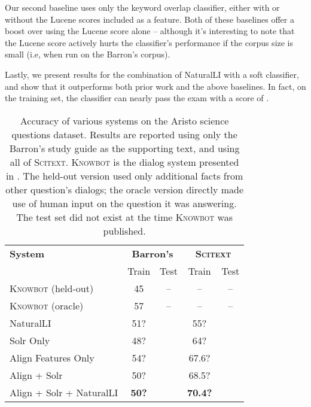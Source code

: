 Our second baseline uses only the keyword overlap classifier, either with or without
  the Lucene scores included as a feature.
Both of these baselines offer a boost over using the Lucene score alone -- although
  it's interesting to note that the Lucene score actively hurts the classifier's
  performance if the corpus size is small (i.e, when run on the Barron's corpus).

Lastly, we present results for the combination of NaturalLI with a soft classifier,
  and show that it outperforms both prior work and the above baselines.
In fact, on the training set, the classifier can nearly pass the exam with a score
  of .

%
%
\def\t#1{\small{#1}}
\def\b#1{\t{\textbf{#1}}}
\def\colspaceS{2.0mm}
\def\colspaceM{3.0mm}
\def\colspaceL{4.0mm}

\begin{table}
\begin{center}
\begin{tabular}{l@{\hskip \colspaceL}c@{\hskip \colspaceS}c@{\hskip \colspaceL}c@{\hskip \colspaceS}c}
\hline
\textbf{System} & \multicolumn{2}{c}{\textbf{Barron's}} & \multicolumn{2}{c}{\textbf{\textsc{Scitext}}} \\
 & Train & Test & Train & Test \\
\hline
\t{\textsc{Knowbot} (held-out)} & \t{45} & \t{--} & \t{--} & \t{--} \\
\t{\textsc{Knowbot} (oracle)}   & \t{57} & \t{--} & \t{--} & \t{--} \\
\hline                                                         
\t{NaturalLI}                   & \t{51?} & \t{  } & \t{55?} & \t{ } \\
\t{Solr Only}                   & \t{48?} & \t{  } & \t{64?} & \t{ } \\
\t{Align Features Only}         & \t{54?} & \t{  } & \t{67.6?} & \t{ } \\
\t{Align + Solr}                & \t{50?} & \t{  } & \t{68.5?} & \t{ } \\
\t{Align + Solr + NaturalLI}    & \b{50?} & \b{  } & \b{70.4?} & \b{ } \\
\hline
\end{tabular}
\end{center}
\caption{
\label{tab:aristonaturalli}
Accuracy of various systems on the Aristo science questions dataset.
Results are reported using only the Barron's study guide as the supporting
  text, and using all of \textsc{Scitext}.
\textsc{Knowbot} is the dialog system presented in .
The held-out version used only additional facts from other question's dialogs;
  the oracle version directly made use of human input on the question it was 
  answering.
The test set did not exist at the time \textsc{Knowbot} was published.
}
\end{table}
%
%

